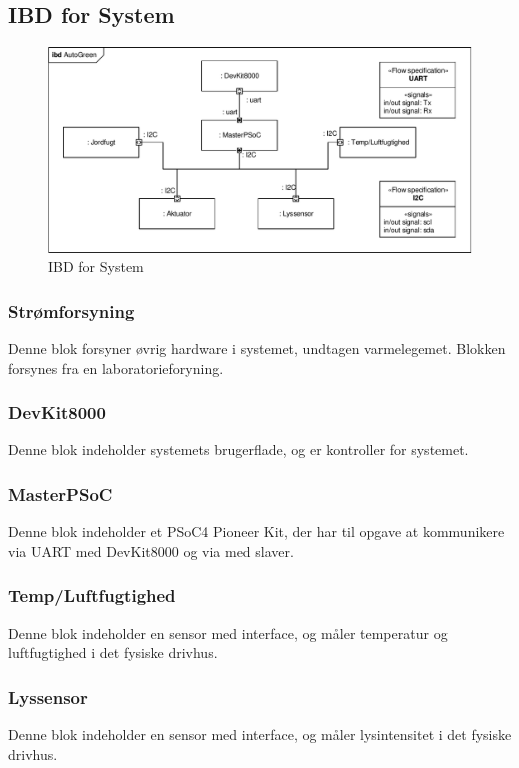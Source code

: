 \subsection{IBD for System}
\begin{figure}[h]
\centering 
\includegraphics[width={\textwidth}, trim=0 0 0 0, clip=true] {../fig/ibd_system.pdf}
\caption{IBD for System}
\label{fig:ibd_system}
\end{figure}

\subsubsection{Strømforsyning}
Denne blok forsyner øvrig hardware i systemet, undtagen varmelegemet. Blokken forsynes fra en laboratorieforyning. 
\subsubsection{DevKit8000}
Denne blok indeholder systemets brugerflade, og er kontroller for systemet. 
\subsubsection{MasterPSoC}
Denne blok indeholder et PSoC4 Pioneer Kit, der har til opgave at kommunikere via UART med DevKit8000 og via \IIC med slaver.  
\subsubsection{Temp/Luftfugtighed}
Denne blok indeholder en sensor med \IIC interface, og måler temperatur og luftfugtighed i det fysiske drivhus.
\subsubsection{Lyssensor}
Denne blok indeholder en sensor med \IIC interface, og måler lysintensitet i det fysiske drivhus. 
